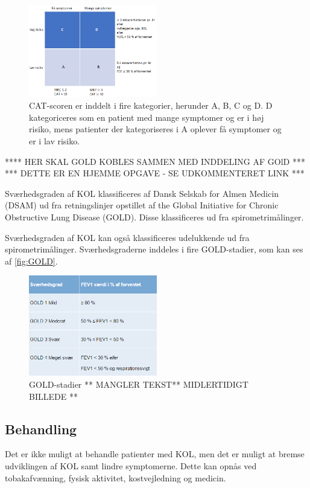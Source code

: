 \begin{figure} [H]
\centering
\includegraphics[width=0.5\textwidth]{figures/CAT}
\caption{CAT-scoren er inddelt i fire kategorier, herunder A, B, C og D. D kategoriceres som en patient med mange symptomer og er i høj risiko, mens patienter der kategoriseres i A oplever få symptomer og er i lav risiko. \cite{Basisbogen2016, Sundhed2013}}
\label{fig:CAT}
\end{figure} 
 
\noindent
**** HER SKAL GOLD KOBLES SAMMEN MED INDDELING AF GOlD ***
*** DETTE ER EN HJEMME OPGAVE - SE UDKOMMENTERET LINK ***

Sværhedsgraden af KOL klassificeres af Dansk Selskab for Almen Medicin (DSAM) ud fra retningslinjer opstillet af the Global Initiative for Chronic Obstructive Lung Disease (GOLD). Disse klassificeres ud fra spirometrimålinger. 

Sværhedsgraden af KOL kan også klassificeres udelukkende ud fra spirometrimålinger. Sværhedsgraderne inddeles i fire GOLD-stadier, som kan ses af \autoref{fig:GOLD}.

\begin{figure} [H]
\centering
\includegraphics[width=0.5\textwidth]{figures/GOLD}
\caption{GOLD-stadier ** MANGLER TEKST** MIDLERTIDIGT BILLEDE ** \cite{Basisbogen2016, Sundhed2013}}
\label{fig:GOLD}
\end{figure} 


\subsection{Behandling}
Det er ikke muligt at behandle patienter med KOL, men det er muligt at bremse udviklingen af KOL samt lindre symptomerne. Dette kan opnås ved tobakafvænning, fysisk aktivitet, kostvejledning og medicin. 


